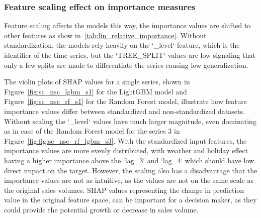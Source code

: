 


\subsubsection{Feature scaling effect on importance measures} \label{subsec:feature_scaling_effect}
Feature scaling affects the models this way, the importance values are shifted to other features as show in~\ref{tab:lin_relative_importance}.
Without standardization, the models rely heavily on the `\_level` feature, which is the identifier of the time series,
but the `TREE_SPLIT` values are low signaling that only a few splits are made to differentiate the series causing low generalization.

The violin plots of SHAP values for a single series, shown in Figure~\ref{fig:sc_nsc_lgbm_s1} for the LightGBM model and Figure~\ref{fig:sc_nsc_rf_s1} for the Random Forest model, illustrate how feature importance values differ between standardized and non-standardized datasets.
Without scaling the `_level` values have much larger magnitude, even dominating as in case of the Random Forest model for the series 3 in Figure~\ref{fig:fig:sc_nsc_rf_lgbm_s3}.
With the standardized input features, the importance values are more evenly distributed, with weather and holiday effect having a higher importance above the `lag_3` and `lag_4` which should have low direct impact on the target.
However, the scaling also has a disadvantage that the importance values are not as intuitive,
as the values are not on the same scale as the original sales volumes.
SHAP values representing the change in prediction value in the original feature space, can be important for a decision maker, as they could provide the potential growth or decrease in sales volume.

